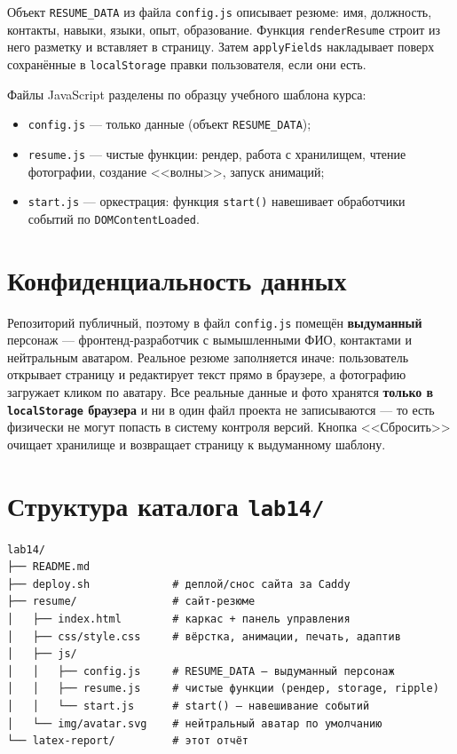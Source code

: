 Объект \texttt{RESUME\_DATA} из файла \texttt{config.js} описывает резюме:
имя, должность, контакты, навыки, языки, опыт, образование. Функция
\texttt{renderResume} строит из него разметку и вставляет в страницу. Затем
\texttt{applyFields} накладывает поверх сохранённые в \texttt{localStorage}
правки пользователя, если они есть.

Файлы JavaScript разделены по образцу учебного шаблона курса:
\begin{itemize}
  \item \texttt{config.js} --- только данные (объект \texttt{RESUME\_DATA});
  \item \texttt{resume.js} --- чистые функции: рендер, работа с хранилищем,
        чтение фотографии, создание <<волны>>, запуск анимаций;
  \item \texttt{start.js} --- оркестрация: функция \texttt{start()}
        навешивает обработчики событий по \texttt{DOMContentLoaded}.
\end{itemize}

\section{Конфиденциальность данных}

Репозиторий публичный, поэтому в файл \texttt{config.js} помещён
\textbf{выдуманный} персонаж --- фронтенд-разработчик с вымышленными ФИО,
контактами и нейтральным аватаром. Реальное резюме заполняется иначе:
пользователь открывает страницу и редактирует текст прямо в браузере, а
фотографию загружает кликом по аватару. Все реальные данные и фото хранятся
\textbf{только в \texttt{localStorage} браузера} и ни в один файл проекта не
записываются --- то есть физически не могут попасть в систему контроля
версий. Кнопка <<Сбросить>> очищает хранилище и возвращает страницу к
выдуманному шаблону.

\section{Структура каталога \texttt{lab14/}}

\begin{lstlisting}[caption={Файловая структура \texttt{lab14/}},captionpos=b]
lab14/
├── README.md
├── deploy.sh             # деплой/снос сайта за Caddy
├── resume/               # сайт-резюме
│   ├── index.html        # каркас + панель управления
│   ├── css/style.css     # вёрстка, анимации, печать, адаптив
│   ├── js/
│   │   ├── config.js     # RESUME_DATA — выдуманный персонаж
│   │   ├── resume.js     # чистые функции (рендер, storage, ripple)
│   │   └── start.js      # start() — навешивание событий
│   └── img/avatar.svg    # нейтральный аватар по умолчанию
└── latex-report/         # этот отчёт
\end{lstlisting}

